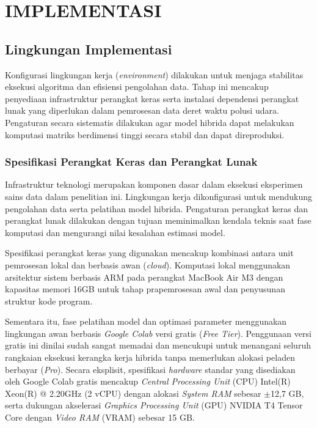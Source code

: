 \cleardoublepage
\chapter{IMPLEMENTASI}
\label{chap:implementasi}

\section{Lingkungan Implementasi}

Konfigurasi lingkungan kerja (\textit{environment}) dilakukan untuk menjaga stabilitas eksekusi algoritma dan efisiensi pengolahan data. Tahap ini mencakup penyediaan infrastruktur perangkat keras serta instalasi dependensi perangkat lunak yang diperlukan dalam pemrosesan data deret waktu polusi udara. Pengaturan secara sistematis dilakukan agar model hibrida dapat melakukan komputasi matriks berdimensi tinggi secara stabil dan dapat direproduksi.

\subsection{Spesifikasi Perangkat Keras dan Perangkat Lunak}

Infrastruktur teknologi merupakan komponen dasar dalam eksekusi eksperimen sains data dalam penelitian ini. Lingkungan kerja dikonfigurasi untuk mendukung pengolahan data serta pelatihan model hibrida. Pengaturan perangkat keras dan perangkat lunak dilakukan dengan tujuan meminimalkan kendala teknis saat fase komputasi dan mengurangi nilai kesalahan estimasi model.

Spesifikasi perangkat keras yang digunakan mencakup kombinasi antara unit pemrosesan lokal dan berbasis awan (\textit{cloud}). Komputasi lokal menggunakan arsitektur sistem berbasis ARM pada perangkat MacBook Air M3 dengan kapasitas memori 16GB untuk tahap prapemrosesan awal dan penyusunan struktur kode program. 

Sementara itu, fase pelatihan model dan optimasi parameter menggunakan lingkungan awan berbasis \textit{Google Colab} versi gratis (\textit{Free Tier}). Penggunaan versi gratis ini dinilai sudah sangat memadai dan mencukupi untuk menangani seluruh rangkaian eksekusi kerangka kerja hibrida tanpa memerlukan alokasi peladen berbayar (\textit{Pro}). Secara eksplisit, spesifikasi \textit{hardware} standar yang disediakan oleh Google Colab gratis mencakup \textit{Central Processing Unit} (CPU) Intel(R) Xeon(R) @ 2.20GHz (2 vCPU) dengan alokasi \textit{System RAM} sebesar $\pm$12,7 GB, serta dukungan akselerasi \textit{Graphics Processing Unit} (GPU) NVIDIA T4 Tensor Core dengan \textit{Video RAM} (VRAM) sebesar 15 GB. 

